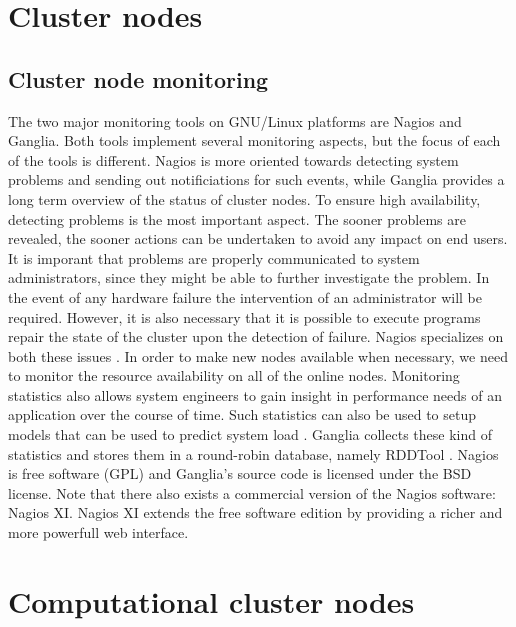\documentclass[12pt]{report}
\begin{document}
\section{Cluster nodes}
\subsection{Cluster node monitoring}
The two major monitoring tools on GNU/Linux platforms are Nagios and
Ganglia. Both tools implement several monitoring aspects, but the
focus of each of the tools is different. Nagios is more oriented
towards detecting system problems and sending out notificiations for
such events, while Ganglia provides a long term overview of the status
of cluster nodes. To ensure high availability, detecting problems is
the most important aspect. The sooner problems are revealed, the
sooner actions can be undertaken to avoid any impact on end users. It
is imporant that problems are properly communicated to system
administrators, since they might be able to further investigate the
problem. In the event of any hardware failure the intervention of
an administrator will be required. However, it is also necessary that
 it is possible to execute programs repair the state of the cluster
 upon the detection of failure. Nagios specializes on both these
 issues \cite{nagios:2013}.
In order to make new nodes available when necessary, we need to
monitor the resource availability on all of the online nodes.
Monitoring statistics also allows system engineers to gain insight in
performance needs of an application over the course of time. 
Such statistics can also be used to setup models that can be used to
predict system load \cite{andreolini:2006}. Ganglia collects these
kind of statistics and stores them in a round-robin database, namely RDDTool
\cite{ganglia:2013} \cite{rrdt:2013}.
Nagios is free software (GPL) and Ganglia's source code is licensed
under the BSD license. Note that there also exists a commercial
version of the Nagios software: Nagios XI. Nagios XI extends the free
software edition by providing a richer and more powerfull web interface.

\section{Computational cluster nodes}
\end{document}
